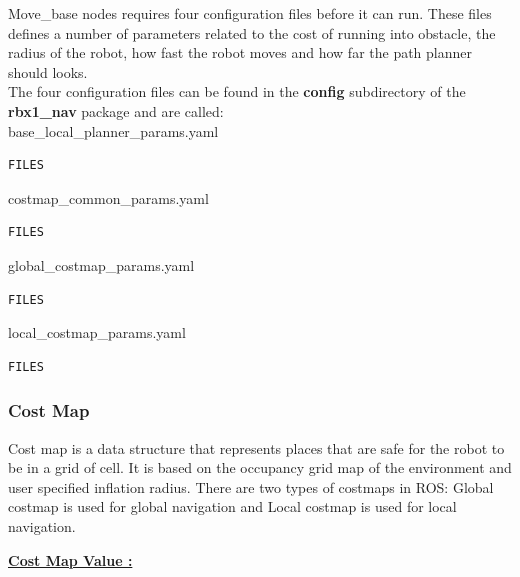 \documentclass[10pt,a4paper]{article}
\begin{document}
Move\_base nodes requires four configuration files before it can run. These files defines a number of parameters related to the cost of running into obstacle, the radius of the robot, how fast the robot moves and how far the path planner should looks. \\

The four configuration files can be found in the \textbf{config} subdirectory of the \textbf{rbx1\_nav} package and are called: \\

base\_local\_planner\_params.yaml
\begin{lstlisting}[frame=single]
FILES
\end{lstlisting}
costmap\_common\_params.yaml
\begin{lstlisting}[frame=single]
FILES
\end{lstlisting}

global\_costmap\_params.yaml
\begin{lstlisting}[frame=single]
FILES
\end{lstlisting}

local\_costmap\_params.yaml 
\begin{lstlisting}[frame=single]
FILES
\end{lstlisting}

\subsubsection{Cost Map}

Cost map is a data structure that represents places that are safe for the robot to be in a grid of cell. It is based on the occupancy grid map of the environment and user specified inflation radius. There are two types of costmaps in ROS: Global costmap is used for global navigation and Local costmap is used for local navigation.

\underline{\textbf{Cost Map Value :}}\\
\end{document}
